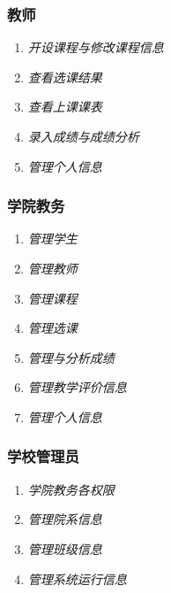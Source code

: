 \subsubsection{教师}
\begin{enumerate}
    \item \textit{开设课程与修改课程信息} \quad 
    \item \textit{查看选课结果} \quad 
    \item \textit{查看上课课表} \quad 
    \item \textit{录入成绩与成绩分析} \quad 
    \item \textit{管理个人信息} \quad 
\end{enumerate}

\subsubsection{学院教务}
\begin{enumerate}
    \item \textit{管理学生} \quad 
    \item \textit{管理教师} \quad 
    \item \textit{管理课程} \quad 
    \item \textit{管理选课} \quad 
    \item \textit{管理与分析成绩} \quad 
    \item \textit{管理教学评价信息} \quad 
    \item \textit{管理个人信息} \quad 
\end{enumerate}

\subsubsection{学校管理员}
\begin{enumerate}
    \item \textit{学院教务各权限} \quad 
    \item \textit{管理院系信息} \quad 
    \item \textit{管理班级信息} \quad 
    \item \textit{管理系统运行信息} \quad 
\end{enumerate}
